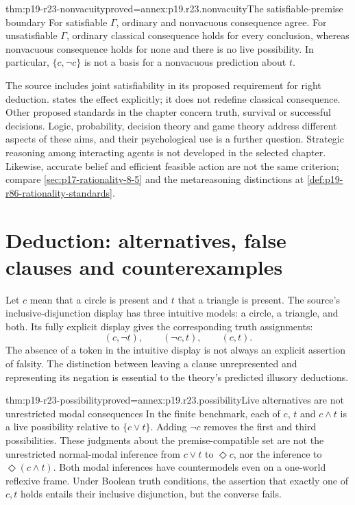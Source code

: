 \begin{hbtheorem}{thm:p19-r23-nonvacuity}{proved=annex:p19.r23.nonvacuity}{The satisfiable-premise boundary}
For satisfiable \(\Gamma\), ordinary and nonvacuous consequence agree.
For unsatisfiable \(\Gamma\), ordinary classical consequence holds for
every conclusion, whereas nonvacuous consequence holds for none and there
is no live possibility. In particular, \(\{c,\neg c\}\) is not a
basis for a nonvacuous prediction about \(t\).
\end{hbtheorem}

The source includes joint satisfiability in its proposed requirement for
right deduction.  states the effect explicitly;
it does not redefine classical consequence. Other proposed standards in
the chapter concern truth, survival or successful decisions. Logic,
probability, decision theory and game theory address different aspects of
these aims, and their psychological use is a further question. Strategic
reasoning among interacting agents is not developed in the selected
chapter. Likewise, accurate belief and efficient feasible action are not
the same criterion; compare \cref{sec:p17-rationality-8-5} and the
metareasoning distinctions at \cref{def:p19-r86-rationality-standards}.

\section{Deduction: alternatives, false clauses and counterexamples}
\label{sec:p19-r23-deduction}

Let \(c\) mean that a circle is present and \(t\) that a triangle is
present. The source's inclusive-disjunction display has three intuitive
models: a circle, a triangle, and both. Its fully explicit display gives
the corresponding truth assignments:
\[
 (c,\neg t),\qquad(\neg c,t),\qquad(c,t).
\]
The absence of a token in the intuitive display is not always an explicit
assertion of falsity. The distinction between leaving a clause unrepresented
and representing its negation is essential to the theory's predicted
illusory deductions.

\begin{hbtheorem}{thm:p19-r23-possibility}{proved=annex:p19.r23.possibility}{Live alternatives are not unrestricted modal consequences}
In the finite benchmark, each of \(c\), \(t\) and \(c\land t\)
is a live possibility relative to \(\{c\lor t\}\). Adding \(\neg c\)
removes the first and third possibilities. These judgments about the
premise-compatible set are not the unrestricted normal-modal inference
from \(c\lor t\) to \(\Diamond c\), nor the inference to
\(\Diamond(c\land t)\). Both modal inferences have countermodels even
on a one-world reflexive frame.
Under Boolean truth conditions, the assertion that exactly one of \(c,t\)
holds entails their inclusive disjunction, but the converse fails.
\end{hbtheorem}


